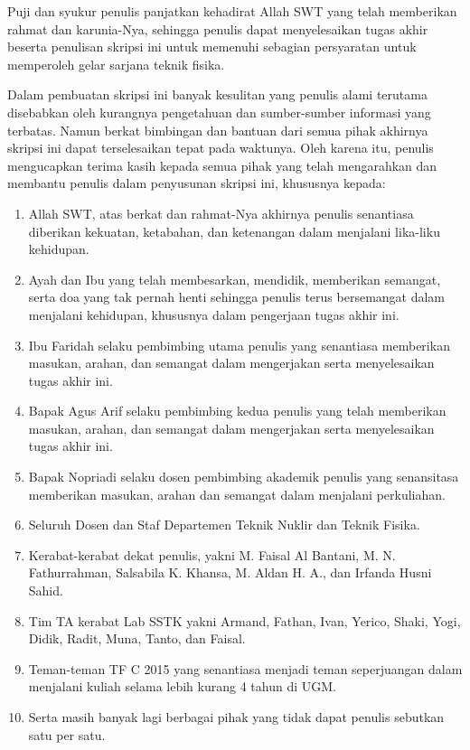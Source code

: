 Puji dan syukur penulis panjatkan kehadirat Allah SWT yang telah memberikan rahmat dan karunia-Nya, sehingga penulis dapat menyelesaikan tugas akhir beserta penulisan skripsi ini untuk memenuhi sebagian persyaratan untuk memperoleh gelar sarjana teknik fisika.

Dalam pembuatan skripsi ini banyak kesulitan yang penulis alami terutama disebabkan oleh kurangnya pengetahuan dan sumber-sumber informasi yang terbatas. Namun berkat bimbingan dan bantuan dari semua pihak akhirnya skripsi ini dapat terselesaikan tepat pada waktunya. Oleh karena itu, penulis mengucapkan terima kasih kepada semua pihak yang telah mengarahkan dan membantu penulis dalam penyusunan skripsi ini, khususnya kepada:

\begin{enumerate}
	\item Allah SWT, atas berkat dan rahmat-Nya akhirnya penulis senantiasa diberikan kekuatan, ketabahan, dan ketenangan dalam menjalani lika-liku kehidupan.
	\item Ayah dan Ibu yang telah membesarkan, mendidik, memberikan semangat, serta doa yang tak pernah henti sehingga penulis terus bersemangat dalam menjalani kehidupan, khususnya dalam pengerjaan tugas akhir ini.
	\item Ibu Faridah selaku pembimbing utama penulis yang senantiasa memberikan masukan, arahan, dan semangat dalam mengerjakan serta menyelesaikan tugas akhir ini.
	\item Bapak Agus Arif selaku pembimbing kedua penulis yang telah memberikan masukan, arahan, dan semangat dalam mengerjakan serta menyelesaikan tugas akhir ini.
	\item Bapak Nopriadi selaku dosen pembimbing akademik penulis yang senansitasa memberikan masukan, arahan dan semangat dalam menjalani perkuliahan.
	\item Seluruh Dosen dan Staf Departemen Teknik Nuklir dan Teknik Fisika.
	\item Kerabat-kerabat dekat penulis, yakni M. Faisal Al Bantani, M. N. Fathurrahman, Salsabila K. Khansa, M. Aldan H. A., dan Irfanda Husni Sahid.	
	\item Tim TA kerabat Lab SSTK yakni Armand, Fathan, Ivan, Yerico, Shaki, Yogi, Didik, Radit, Muna, Tanto, dan Faisal.
	\item Teman-teman TF C 2015 yang senantiasa menjadi teman seperjuangan dalam menjalani kuliah selama lebih kurang 4 tahun di UGM.
	\item Serta masih banyak lagi berbagai pihak yang tidak dapat penulis sebutkan satu per satu.
\end{enumerate}

